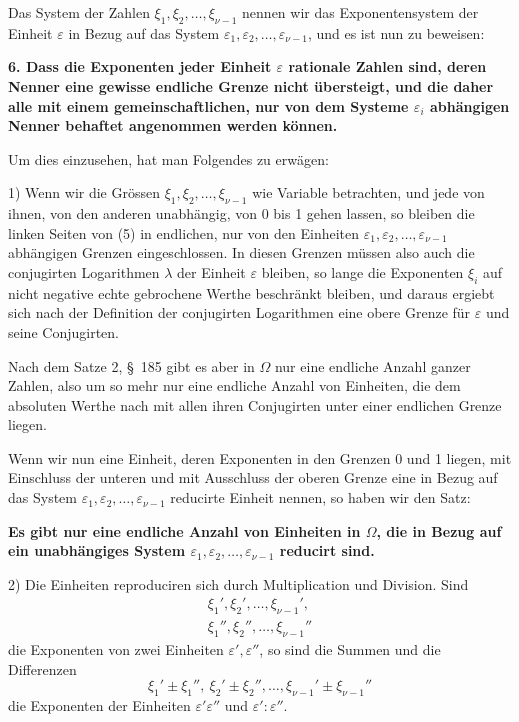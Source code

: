 \documentclass[11pt]{article}
\begin{document}
Das System der Zahlen $\xi_1,\xi_2,\ldots,\xi_{\nu-1}$ nennen wir das Exponentensystem der Einheit $\varepsilon$ in Bezug auf das System $\varepsilon_1,\varepsilon_2,\ldots,\varepsilon_{\nu-1}$, und es ist nun zu beweisen:

\textbf{6. Dass die Exponenten jeder Einheit $\varepsilon$ rationale Zahlen sind, deren Nenner eine gewisse endliche Grenze nicht übersteigt, und die daher alle mit einem gemeinschaftlichen, nur von dem Systeme $\varepsilon_i$ abhängigen Nenner behaftet angenommen werden können.}

Um dies einzusehen, hat man Folgendes zu erwägen:

1) Wenn wir die Grössen $\xi_1,\xi_2,\ldots,\xi_{\nu-1}$ wie Variable betrachten, und jede von ihnen, von den anderen unabhängig, von 0 bis 1 gehen lassen, so bleiben die linken Seiten von (5) in endlichen, nur von den Einheiten $\varepsilon_1,\varepsilon_2,\ldots,\varepsilon_{\nu-1}$ abhängigen Grenzen eingeschlossen. In diesen Grenzen müssen also auch die conjugirten Logarithmen $\lambda$ der Einheit $\varepsilon$ bleiben, so lange
die Exponenten $\xi_i$ auf nicht negative echte gebrochene Werthe beschränkt bleiben, und daraus ergiebt sich nach der Definition der conjugirten Logarithmen eine obere Grenze für $\varepsilon$ und seine Conjugirten.

Nach dem Satze 2, \S~185 gibt es aber in $\Omega$ nur eine endliche Anzahl ganzer Zahlen, also um so mehr nur eine endliche Anzahl von Einheiten, die dem absoluten Werthe nach mit allen ihren Conjugirten unter einer endlichen Grenze liegen.

Wenn wir nun eine Einheit, deren Exponenten in den Grenzen 0 und 1 liegen, mit Einschluss der unteren und mit Ausschluss der oberen Grenze eine in Bezug auf das System $\varepsilon_1,\varepsilon_2,\ldots,\varepsilon_{\nu-1}$ reducirte Einheit nennen, so haben wir den Satz:

\textbf{Es gibt nur eine endliche Anzahl von Einheiten in $\Omega$, die in Bezug auf ein unabhängiges System $\varepsilon_1,\varepsilon_2,\ldots,\varepsilon_{\nu-1}$ reducirt sind.}

2) Die Einheiten reproduciren sich durch Multiplication und Division. Sind
\[
\begin{array}{c}
\xi_1',\xi_2',\ldots,\xi_{\nu-1}',\\
\xi_1'',\xi_2'',\ldots,\xi_{\nu-1}''
\end{array}
\]
die Exponenten von zwei Einheiten $\varepsilon',\varepsilon''$, so sind die Summen und die Differenzen
\[
\xi_1'\pm\xi_1'',\ \xi_2'\pm\xi_2'',\ldots,\xi_{\nu-1}'\pm\xi_{\nu-1}''
\]
die Exponenten der Einheiten $\varepsilon'\varepsilon''$ und $\varepsilon':\varepsilon''$.
\end{document}
